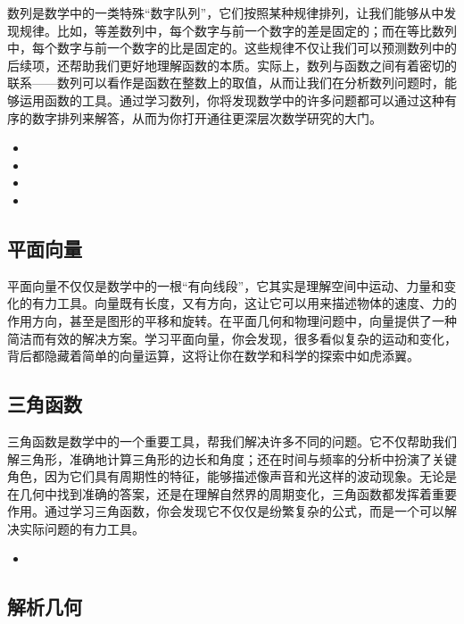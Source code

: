 数列是数学中的一类特殊“数字队列”，它们按照某种规律排列，让我们能够从中发现规律。比如，等差数列中，每个数字与前一个数字的差是固定的；而在等比数列中，每个数字与前一个数字的比是固定的。这些规律不仅让我们可以预测数列中的后续项，还帮助我们更好地理解函数的本质。实际上，数列与函数之间有着密切的联系——数列可以看作是函数在整数上的取值，从而让我们在分析数列问题时，能够运用函数的工具。通过学习数列，你将发现数学中的许多问题都可以通过这种有序的数字排列来解答，从而为你打开通往更深层次数学研究的大门。

\begin{itemize}
\item {}
\item {}
\item {}
\item {}
\end{itemize}
\subsection{平面向量}

平面向量不仅仅是数学中的一根“有向线段”，它其实是理解空间中运动、力量和变化的有力工具。向量既有长度，又有方向，这让它可以用来描述物体的速度、力的作用方向，甚至是图形的平移和旋转。在平面几何和物理问题中，向量提供了一种简洁而有效的解决方案。学习平面向量，你会发现，很多看似复杂的运动和变化，背后都隐藏着简单的向量运算，这将让你在数学和科学的探索中如虎添翼。


\subsection{三角函数}

三角函数是数学中的一个重要工具，帮我们解决许多不同的问题。它不仅帮助我们解三角形，准确地计算三角形的边长和角度；还在时间与频率的分析中扮演了关键角色，因为它们具有周期性的特征，能够描述像声音和光这样的波动现象。无论是在几何中找到准确的答案，还是在理解自然界的周期变化，三角函数都发挥着重要作用。通过学习三角函数，你会发现它不仅仅是纷繁复杂的公式，而是一个可以解决实际问题的有力工具。

\begin{itemize}
\item {}
\end{itemize}
\subsection{解析几何}

